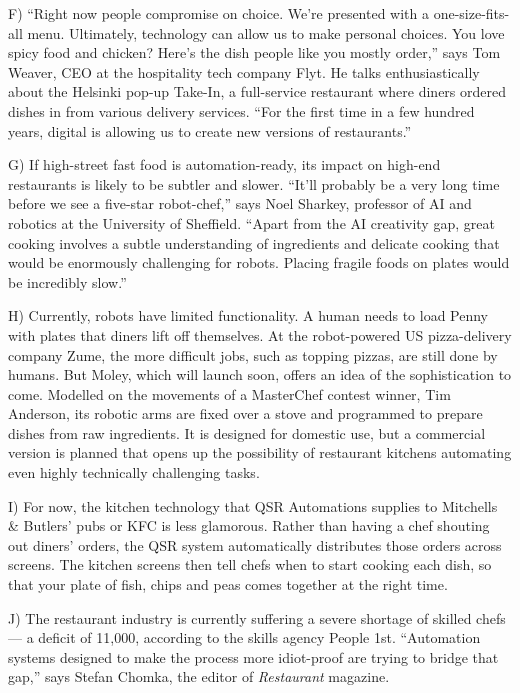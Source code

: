 \documentclass[UTF8,11pt]{ctexart}
\begin{document}
F) “Right now people compromise on choice. We’re presented with a one-size-fits-all menu. Ultimately, technology can allow us to make personal choices. You love spicy food and chicken? Here’s the dish people like you mostly order,” says Tom Weaver, CEO at the hospitality tech company Flyt. He talks enthusiastically about the Helsinki pop-up Take-In, a full-service restaurant where diners ordered dishes in from various delivery services. “For the first time in a few hundred years, digital is allowing us to create new versions of restaurants.”


G) If high-street fast food is automation-ready, its impact on high-end restaurants is likely to be subtler and slower. “It’ll probably be a very long time before we see a five-star robot-chef,” says Noel Sharkey, professor of AI and robotics at the University of Sheffield. “Apart from the AI creativity gap, great cooking involves a subtle understanding of ingredients and delicate cooking that would be enormously challenging for robots. Placing fragile foods on plates would be incredibly slow.”


H) Currently, robots have limited functionality. A human needs to load Penny with plates that diners lift off themselves. At the robot-powered US pizza-delivery company Zume, the more difficult jobs, such as topping pizzas, are still done by humans. But Moley, which will launch soon, offers an idea of the sophistication to come. Modelled on the movements of a MasterChef contest winner, Tim Anderson, its robotic arms are fixed over a stove and programmed to prepare dishes from raw ingredients. It is designed for domestic use, but a commercial version is planned that opens up the possibility of restaurant kitchens automating even highly technically challenging tasks.


I) For now, the kitchen technology that QSR Automations supplies to Mitchells \& Butlers’ pubs or KFC is less glamorous. Rather than having a chef shouting out diners’ orders, the QSR system automatically distributes those orders across screens. The kitchen screens then tell chefs when to start cooking each dish, so that your plate of fish, chips and peas comes together at the right time.


J) The restaurant industry is currently suffering a severe shortage of skilled chefs — a deficit of 11,000, according to the skills agency People 1st. “Automation systems designed to make the process more idiot-proof are trying to bridge that gap,” says Stefan Chomka, the editor of \textit{Restaurant} magazine.
\end{document}
